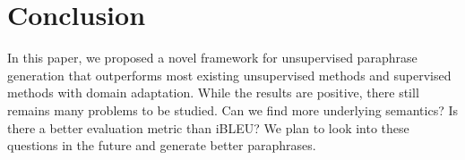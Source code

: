 \section{Conclusion}
In this paper, we proposed a novel framework for unsupervised paraphrase generation that outperforms most existing unsupervised methods and supervised methods with domain adaptation. While the results are positive, there still remains many problems to be studied. Can we find more underlying semantics? Is there a better evaluation metric than iBLEU? We plan to look into these questions in the future and generate better paraphrases. 
